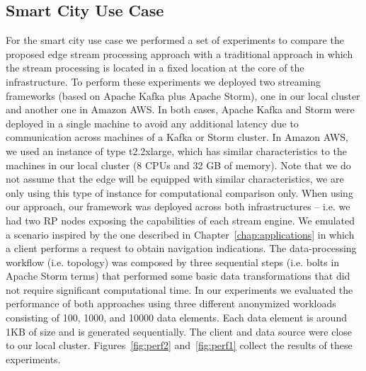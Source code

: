 \subsection{Smart City Use Case}

For the smart city use case we performed a set of experiments to compare the proposed edge stream processing approach with a traditional approach in which the stream processing is located in a fixed location at the core of the infrastructure. To perform these experiments we deployed two streaming frameworks (based on Apache Kafka plus Apache Storm), one in our local cluster and another one in Amazon AWS. In both cases, Apache Kafka and Storm were deployed in a single machine to avoid any additional latency due to communication across machines of a Kafka or Storm cluster. In Amazon AWS, we used an instance of type  t2.2xlarge, which has similar characteristics to the machines in our local cluster (8 CPUs and 32 GB of memory). Note that we do not assume that the edge will be equipped with similar characteristics, we are only using this type of instance for computational comparison only. When using our approach, our framework was deployed across both infrastructures -- i.e. we had two RP nodes exposing the capabilities of each stream engine. We emulated a scenario inspired by the one described in Chapter~\ref{chap:applications} in which a client performs a request to obtain navigation indications. The data-processing workflow (i.e. topology) was composed by three sequential steps (i.e. bolts in Apache Storm terms) that performed some basic data transformations that did not require significant computational time. In our experiments we evaluated the performance of both approaches using three different anonymized workloads consisting of 100, 1000, and 10000 data elements. Each data element is around 1KB of size and is generated sequentially. The client and data source were close to our local cluster. Figures~\ref{fig:perf2} and~\ref{fig:perf1} collect the results of these experiments.

